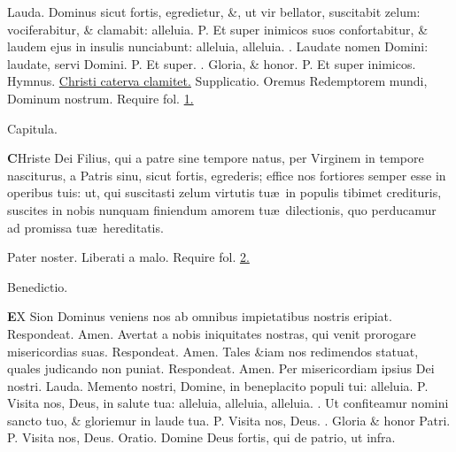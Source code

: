 \documentclass[letter,11pt]{book}
\makeatletter
\DeclareRobustCommand{\Vbar}{\vers@resp{-0.1em}{V}}
\newcommand{\vers@resp@sym}{\raisebox{0.2ex}{\rotatebox[origin=c]{-20}{$\m@th\rceil$}}}
\newcommand{\vers@resp}[2]{%
  {\ooalign{\hidewidth\kern#1\vers@resp@sym\hidewidth\cr#2\cr}}%
}%
\def\P{\color{Red} P. \color{black}}
\def\V{\color{Red} \Vbar . \color{black}}
\makeatother
\begin{document}
\begin{multicols}{2}
\newline \color{Red} Lauda. \color{black} Dominus sicut fortis, egredietur, \&, ut vir bellator, suscitabit zelum: vociferabitur, \& clamabit: alleluia. \P Et super inimicos suos confortabitur, \& laudem ejus in insulis nunciabunt: alleluia, alleluia. \V Laudate nomen Domini: laudate, servi Domini. \P Et super. \V Gloria, \& honor. \P Et super inimicos.
\newline \color{Red} Hymnus. \color{black} \hyperlink{hymn.Christi}{Christi caterva clamitet.} \color{Red} Supplicatio. \color{black} Oremus Redemptorem mundi, Dominum nostrum. \color{Red} Require fol. \color{black} \hyperlink{page.1}{1.}
\vspace{-.5em} \begin{center} \color{Red} Capitula. \color{black} \end{center} \vspace{-.5em}
\lettrine[lines=2]{\bfseries \color{Red} C}{}Hriste Dei Filius, qui a patre sine tempore natus, per Virginem in tempore nasciturus, a Patris sinu, sicut fortis, egrederis; effice nos fortiores semper esse in operibus tuis: ut, qui suscitasti zelum virtutis tu\ae \ in populis tibimet credituris, suscites in nobis nunquam finiendum amorem tu\ae \ dilectionis, quo perducamur ad promissa tu\ae \ hereditatis.
\par Pater noster. Liberati a malo. \color{Red} Require fol. \color{black} \hyperlink{page.2}{2.}
\vspace{-.5em} \begin{center} \color{Red} Benedictio. \color{black} \end{center} \vspace{-.5em}
\lettrine[lines=2]{\bfseries \color{Red} E}{}X Sion Dominus veniens nos ab omnibus impietatibus nostris eripiat. \color{Red} Respondeat. \color{black} Amen. Avertat a nobis iniquitates nostras, qui venit prorogare misericordias suas. \color{Red} Respondeat. \color{black} Amen. Tales \&iam nos redimendos statuat, quales judicando non puniat. \color{Red} Respondeat. \color{black} Amen. Per misericordiam ipsius Dei nostri.
\newline \color{Red} Lauda. \color{black} Memento nostri, Domine, in
beneplacito populi tui: alleluia. \P Visita nos, Deus, in salute tua: alleluia, alleluia, alleluia. \V Ut confiteamur nomini sancto tuo, \& gloriemur in laude tua. \P Visita nos, Deus. \V Gloria \& honor Patri. \P Visita nos, Deus. \color{Red} Oratio. \color{black} Domine Deus fortis, qui de patrio, \color{Red} ut infra. \color{black}

\end{multicols}
\end{document}
